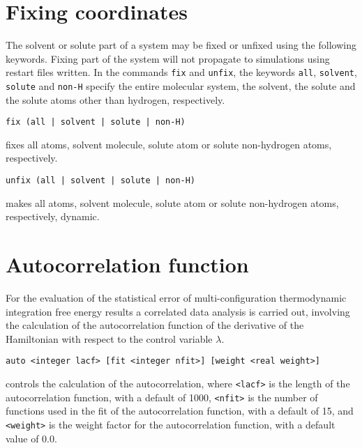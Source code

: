 \section{Fixing coordinates}
The solvent or solute part of a system may be fixed or unfixed using
the following keywords. Fixing part of the system will not propagate to
simulations using restart files written. In the commands \verb+fix+
and \verb+unfix+, the keywords \verb+all+, \verb+solvent+,
\verb+solute+ and \verb+non-H+ specify the entire molecular system,
the solvent, the solute and the solute atoms other than hydrogen,
respectively.
\begin{description}
\item
\begin{verbatim}
fix (all | solvent | solute | non-H)
\end{verbatim}
fixes all atoms, solvent molecule, solute atom or solute non-hydrogen atoms,
respectively.
\item
\begin{verbatim}
unfix (all | solvent | solute | non-H)
\end{verbatim}
makes all atoms, solvent molecule, solute atom or solute non-hydrogen atoms,
respectively, dynamic.
\end{description}

\section{Autocorrelation function}
For the evaluation of the statistical error of multi-configuration
thermodynamic integration free energy results a correlated data 
analysis is carried out, involving the calculation of the
autocorrelation function of the derivative of the Hamiltonian with
respect to the control variable $\lambda$.
\begin{description}

\item 
\begin{verbatim}
auto <integer lacf> [fit <integer nfit>] [weight <real weight>]
\end{verbatim}
controls the calculation of the autocorrelation,
where \verb+<lacf>+ is the length of the autocorrelation function, with
a default of 1000, \verb+<nfit>+ is the number of functions used in the
fit of the autocorrelation function, with a default of 15, and
\verb+<weight>+ is the weight factor for the autocorrelation function,
with a default value of 0.0.
\end{description}


